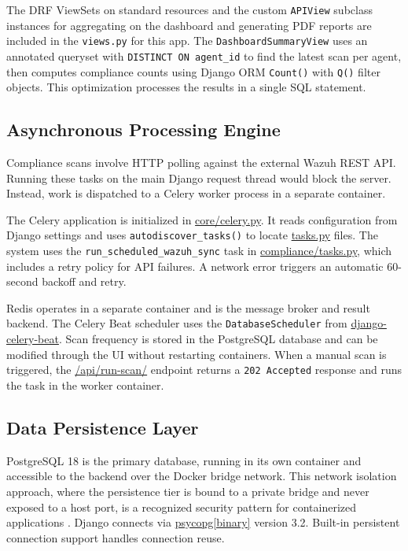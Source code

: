 The DRF ViewSets on standard resources and the custom \texttt{APIView} subclass instances for aggregating on the dashboard and generating PDF reports are included in the \texttt{views.py} for this app. The \texttt{Dashboard\allowbreak Summary\allowbreak View} uses an annotated queryset with \texttt{DISTINCT ON agent\_id} to find the latest scan per agent, then computes compliance counts using Django ORM \texttt{Count()} with \texttt{Q()} filter objects. This optimization processes the results in a single SQL statement.

\subsection{Asynchronous Processing Engine}
Compliance scans involve HTTP polling against the external Wazuh REST API. Running these tasks on the main Django request thread would block the server. Instead, work is dispatched to a Celery worker process in a separate container.

The Celery application is initialized in \url{core/celery.py}. It reads configuration from Django settings and uses \texttt{autodiscover\_tasks()} to locate \url{tasks.py} files. The system uses the \texttt{run\_scheduled\_\allowbreak wazuh\_sync} task in \url{compliance/tasks.py}, which includes a retry policy for API failures. A network error triggers an automatic 60-second backoff and retry.

Redis operates in a separate container and is the message broker and result backend. The Celery Beat scheduler uses the \texttt{Database\allowbreak Scheduler} from \url{django-celery-beat}. Scan frequency is stored in the PostgreSQL database and can be modified through the UI without restarting containers. When a manual scan is triggered, the \url{/api/run-scan/} endpoint returns a \texttt{202 Accepted} response and runs the task in the worker container.

\subsection{Data Persistence Layer}
PostgreSQL 18 is the primary database, running in its own container and accessible to the backend over the Docker bridge network. This network isolation approach, where the persistence tier is bound to a private bridge and never exposed to a host port, is a recognized security pattern for containerized applications \cite{casalicchio2020state}. Django connects via \url{psycopg[binary]} version 3.2. Built-in persistent connection support handles connection reuse.

